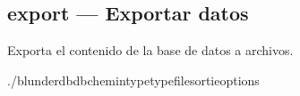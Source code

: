 \documentclass[letterpaper,10pt,spanish]{sphinxmanual}
\begin{document}
\subsection{export — Exportar datos}
\label{\detokenize{cli:export-exporter-des-donnees}}
\sphinxAtStartPar
Exporta el contenido de la base de datos a archivos.

\begin{sphinxVerbatim}[commandchars=\\\{\}]
./blunderdb\PYGZhy{}\PYGZhy{}db\PYGZlt{}chemin\PYGZgt{}\PYGZhy{}\PYGZhy{}type\PYGZlt{}type\PYGZgt{}\PYGZhy{}\PYGZhy{}file\PYGZlt{}sortie\PYGZgt{}\PYG{o}{[}options\PYG{o}{]}
\end{sphinxVerbatim}
\end{document}
